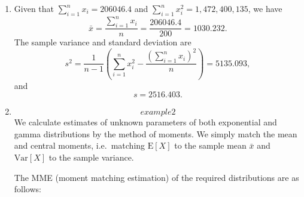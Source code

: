 \documentclass[
]{book}
\theoremstyle{definition}
\theoremstyle{definition}
\theoremstyle{definition}
\theoremstyle{definition}
\theoremstyle{remark}
\begin{document}
\begin{enumerate}
\def\labelenumi{\arabic{enumi}.}
\item
  Given that \(\sum_{i=1}^n x_i = 206046.4\) and
  \(\sum_{i=1}^n x_i^2 = 1,472,400,135\), we have
  \[\bar{x} = \frac{\sum_{i=1}^n x_i}{n} = \frac{206046.4}{200} = 1030.232.\]
  The sample variance and standard deviation are
  \[s^2 = \frac{1}{n-1} \left( \sum_{i=1}^n x_i^2 - \frac{(\sum_{i=1}^n x_i)^2}{n} \right) = 5135.093,\]
  and \[s = 2516.403.\]
\item
  \protect\hypertarget{example2}{}{\[example2\]} We calculate estimates of
  unknown parameters of both exponential and gamma distributions by
  the method of moments. We simply match the mean and central moments,
  i.e.~matching \(\mathrm{E}[X]\) to the sample mean \(\bar{x}\) and
  \(\mathrm{Var}[X]\) to the sample variance.

  The MME (moment matching estimation) of the required distributions
  are as follows:


\end{enumerate}
\end{document}
